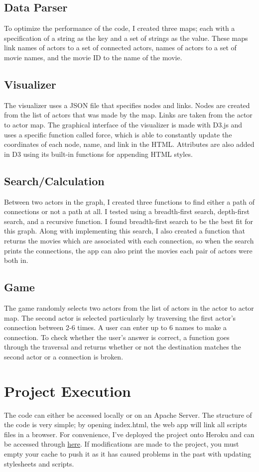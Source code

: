 \documentclass[a4paper,11pt]{article}
\begin{document}
\subsection*{Data Parser}
To optimize the performance of the code, I created three maps; each with a specification of a string as the key and a set of strings as the value. These maps link names of actors to a set of connected actors, names of actors to a set of movie names, and the movie ID to the name of the movie.

\subsection*{Visualizer}
The visualizer uses a JSON file that specifies nodes and links. Nodes are created from the list of actors that was made by the map. Links are taken from the actor to actor map. The graphical interface of the visualizer is made with D3.js and uses a specific function called force, which is able to constantly update the coordinates of each node, name, and link in the HTML. Attributes are also added in D3 using its built-in functions for appending HTML styles.

\subsection*{Search/Calculation}
Between two actors in the graph, I created three functions to find either a path of connections or not a path at all. I tested using a breadth-first search, depth-first search, and a recursive function. I found breadth-first search to be the best fit for this graph. Along with implementing this search, I also created a function that returns the movies which are associated with each connection, so when the search prints the connections, the app can also print the movies each pair of actors were both in.

\subsection*{Game}
The game randomly selects two actors from the list of actors in the actor to actor map. The second actor is selected particularly by traversing the first actor's connection between 2-6 times. A user can enter up to 6 names to make a connection. To check whether the user's answer is correct, a function goes through the traversal and returns whether or not the destination matches the second actor or a connection is broken.

\section*{Project Execution}
The code can either be accessed locally or on an Apache Server. The structure of the code is very simple; by opening index.html, the web app will link all scripts files in a browser. For convenience, I've deployed the project onto Heroku and can be accessed through \href{http://sevenkevinbacon.herokuapp.com}{here}. If modifications are made to the project, you must empty your cache to push it as it has caused problems in the past with updating stylesheets and scripts.
\end{document}
